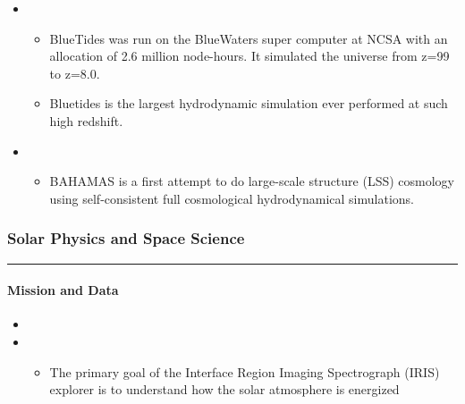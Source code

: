 \documentclass[letterpaper,10pt,english]{sphinxmanual}
\begin{document}
\begin{itemize}
\begin{itemize}
\end{itemize}

\item {} 
\begin{itemize}
\item {} 
BlueTides was run on the BlueWaters super computer at NCSA with an
allocation of 2.6 million node-hours. It simulated the universe
from z=99 to z=8.0.

\item {} 
Bluetides is the largest hydrodynamic simulation ever performed at
such high redshift.

\end{itemize}

\item {} 
\begin{itemize}
\item {} 
BAHAMAS is a first attempt to do large-scale structure (LSS)
cosmology using self-consistent full cosmological hydrodynamical
simulations.

\end{itemize}

\end{itemize}


\subsubsection{Solar Physics and Space Science}
\label{\detokenize{resource/astro/topics/solar_physics:solar-physics-and-space-science}}\label{\detokenize{resource/astro/topics/solar_physics::doc}}


\bigskip\hrule\bigskip



\paragraph{Mission and Data}
\label{\detokenize{resource/astro/topics/solar_physics:mission-and-data}}\begin{itemize}
\item {} 

\item {} 
\begin{itemize}
\item {} 
The primary goal of the Interface Region Imaging Spectrograph
(IRIS) explorer is to understand how the solar atmosphere is
energized

\end{itemize}

\end{itemize}
\end{document}
